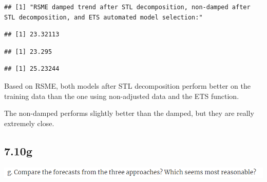 \documentclass[]{book}
\newenvironment{Shaded}{\begin{snugshade}}{\end{snugshade}}
\newcommand{\KeywordTok}[1]{\textcolor[rgb]{0.13,0.29,0.53}{\textbf{#1}}}
\newcommand{\NormalTok}[1]{#1}
\newcommand{\OperatorTok}[1]{\textcolor[rgb]{0.81,0.36,0.00}{\textbf{#1}}}
\begin{document}
\begin{verbatim}
## [1] "RSME damped trend after STL decomposition, non-damped after STL decomposition, and ETS automated model selection:"
\end{verbatim}

\begin{Shaded}
\end{Shaded}

\begin{verbatim}
## [1] 23.32113
\end{verbatim}

\begin{Shaded}
\end{Shaded}

\begin{verbatim}
## [1] 23.295
\end{verbatim}

\begin{Shaded}
\end{Shaded}

\begin{verbatim}
## [1] 25.23244
\end{verbatim}

Based on RSME, both models after STL decomposition perform better on the training data than the one using non-adjusted data and the ETS function.

The non-damped performs slightly better than the damped, but they are really extremely close.

\hypertarget{g-1}{%
\subsection{7.10g}\label{g-1}}

\includegraphics{./week4/7.10g.png}
\end{document}

